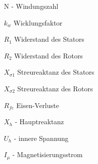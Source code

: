 \begin{minipage}{0.4\linewidth}
\begin{compactitem}
\item N - Windungszahl
\item $k_w$ Wicklungsfaktor
\item $R_1$ Widerstand des Stators
\item $R_2$ Widerstand des Rotors
\item $X_{\sigma 1}$ Streureaktanz des Stators
\item $X_{\sigma 2}$ Streureaktanz des Rotors
\item $R_{fe}$ Eisen-Verluste
\item $X_h$ - Hauptreaktanz
\item $U_h$ - innere Spannung
\item $I_\mu$ - Magnetisierungsstrom
\end{compactitem}
\end{minipage}
